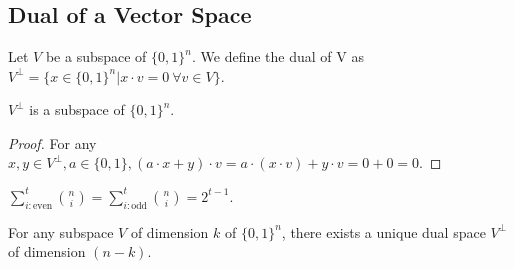 \appendix

\chapter{}
\section{Dual of a Vector Space}
\begin{definition} 
Let $V$ be a subspace of $\{0,1\}^n$. 
We define the dual of V as 
$V^\perp = \{ x \in \{ 0,1 \}^n | x \cdot v = 0 \ \forall v \in V \}$.
\end{definition}

\begin{theorem}
$V^\perp$ is a subspace of $\{ 0,1 \}^n$.
\end{theorem}

\begin{proof}
For any $x, y \in V^\perp, a \in \{0,1\}, (a \cdot x+y)\cdot v = a \cdot (x \cdot v) + y \cdot v = 0 + 0 = 0$. 
\end{proof} 

\begin{lemma} $\sum \limits_{i: \text{even}}^t {n \choose i} = 
\sum \limits_{i: \text{odd}}^t {n \choose i} = 2^{t-1} $.
\end{lemma}

\begin{theorem} For any subspace $V$ of dimension $k$ of $\{ 0,1 \}^n$, 
there exists a unique dual space $V^\perp$ of dimension $(n-k)$.
\end{theorem}

